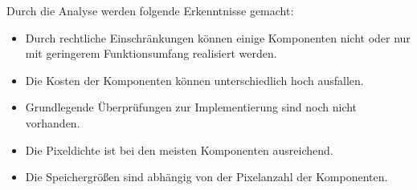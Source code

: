 Durch die Analyse werden folgende Erkenntnisse gemacht:
\begin{itemize}
	\item Durch rechtliche Einschränkungen können einige Komponenten nicht oder nur mit geringerem Funktionsumfang realisiert werden.
	\item Die Kosten der Komponenten können unterschiedlich hoch ausfallen.
	\item Grundlegende Überprüfungen zur Implementierung sind noch nicht vorhanden.
	\item Die Pixeldichte ist bei den meisten Komponenten ausreichend.
	\item Die Speichergrößen sind abhängig von der Pixelanzahl der Komponenten.
\end{itemize}

